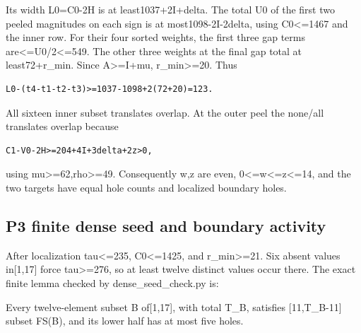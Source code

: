 \documentclass[10pt,a4paper]{article}
\theoremstyle{definition}
\begin{document}
Its width L0=\allowbreak{}C0-2H is at least1037+\allowbreak{}2I+\allowbreak{}delta. The total U0 of the first
two peeled magnitudes on each sign is at most1098-2I-2delta,\allowbreak{} using
C0\textless=\allowbreak{}1467 and the inner row. For their four sorted weights,\allowbreak{} the
first three gap terms are\textless=\allowbreak{}U0/2\textless=\allowbreak{}549. The other three
weights at the final gap total at least72+\allowbreak{}r\_\allowbreak{}min. Since
A\textgreater=\allowbreak{}I+\allowbreak{}mu,\allowbreak{} r\_\allowbreak{}min\textgreater=\allowbreak{}20. Thus

\begin{lstlisting}
L0-(t4-t1-t2-t3)>=1037-1098+2(72+20)=123.
\end{lstlisting}

All sixteen inner subset translates overlap. At the outer peel the
none/all translates overlap because

\begin{lstlisting}
C1-V0-2H>=204+4I+3delta+2z>0,
\end{lstlisting}

using mu\textgreater=\allowbreak{}62,\allowbreak{}rho\textgreater=\allowbreak{}49. Consequently w,\allowbreak{}z are even,\allowbreak{}
0\textless=\allowbreak{}w\textless=\allowbreak{}z\textless=\allowbreak{}14,\allowbreak{} and the two targets have equal hole
counts and localized boundary holes.

\hypertarget{p3-finite-dense-seed-and-boundary-activity}{%
\subsection{P3 finite dense seed and boundary
activity}\label{p3-finite-dense-seed-and-boundary-activity}}

After localization tau\textless=\allowbreak{}235,\allowbreak{} C0\textless=\allowbreak{}1425,\allowbreak{} and
r\_\allowbreak{}min\textgreater=\allowbreak{}21. Six absent values in{[}1,\allowbreak{}17{]} force
tau\textgreater=\allowbreak{}276,\allowbreak{} so at least twelve distinct values occur there. The
exact finite lemma checked by dense\_\allowbreak{}seed\_\allowbreak{}check.py is:

Every twelve-element subset B of{[}1,\allowbreak{}17{]},\allowbreak{} with total T\_\allowbreak{}B,\allowbreak{} satisfies
{[}11,\allowbreak{}T\_\allowbreak{}B-11{]} subset FS(B),\allowbreak{} and its lower half has at most five
holes.
\end{document}
